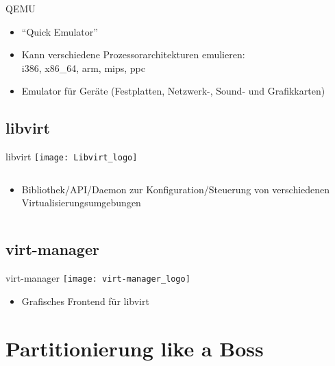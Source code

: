 \documentclass[pdflatex, ngerman]{beamer}
\begin{document}
\begin{frame}{QEMU}
\begin{block}{}
  \begin{itemize}
    \item ``Quick Emulator''
    \item Kann verschiedene Prozessorarchitekturen emulieren: \\
		i386, x86\_64, arm, mips, ppc
    \item Emulator für Geräte (Festplatten, Netzwerk-, Sound- und Grafikkarten)
  \end{itemize}
\end{block}
\end{frame}

\subsection{libvirt}

\begin{frame}{libvirt}
\centering\texttt{[image: Libvirt\_logo]}
\begin{columns}
\column{\textwidth}
\begin{block}{}
  \begin{itemize}
    \item Bibliothek/API/Daemon zur Konfiguration/Steuerung von verschiedenen Virtualisierungsumgebungen
  \end{itemize}
\end{block}
\end{columns}
\end{frame}

\subsection{virt-manager}

\begin{frame}{virt-manager}
\centering\texttt{[image: virt-manager\_logo]}
\begin{block}{}
  \begin{itemize}
    \item Grafisches Frontend für libvirt
  \end{itemize}
\end{block}
\end{frame}

\section{Partitionierung like a Boss}
\end{document}
